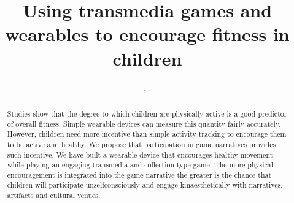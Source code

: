 \documentclass{SIGCHI2015LaTex/sigchi}
\begin{document}
\title{Using transmedia games and wearables to encourage fitness in children}


\author{
, 
,
}




\maketitle

\begin{abstract}

Studies show that the degree to which children are physically active is a good predictor of overall fitness. Simple wearable devices can measure this quantity fairly accurately. However, children need more incentive than simple activity tracking to encourage them to be active and healthy. We propose that participation in game narratives provides such incentive. We have built a wearable device that encourages healthy movement while playing an engaging transmedia and collection-type game. The more physical encouragement is integrated into the game narrative the greater is the chance that children will participate unselfconsciously and engage kinaesthetically with narratives, artifacts and cultural venues.

\end{abstract}
\end{document}
